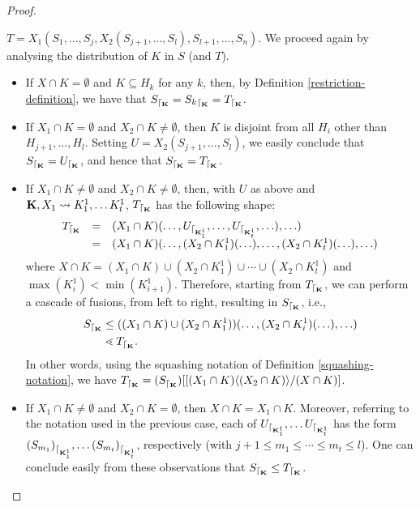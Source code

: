 \documentclass{article}
\theoremstyle{plain}
\theoremstyle{definition}
\newcommand{\inc}{\subseteq}
\newcommand{\hyper}[1]{{\bf #1}}
\newcommand{\restrconstr}[2]{{#1}_{\lceil_{#2}}}
\begin{document}
\begin{proof}
\begin{itemize}
$T=X_1(S_1,\ldots ,S_j,X_2(S_{j+1},\ldots ,S_l),S_{l+1},\ldots,S_n)$. We proceed again by analysing the distribution of $K$ in $S$ (and $T$).
\begin{itemize}
\item If $X\cap K=\emptyset$ and $K\inc H_k$ for any $k$, then, by Definition \ref{restriction-definition}, we have that $\restrconstr{S}{{\bf K}}=\restrconstr{S_k}{{\bf K}}=
\restrconstr{T}{{\bf K}}$.
\item If $X_1\cap K=\emptyset$ and $X_2\cap K\neq\emptyset$, then $K$ is disjoint from all $H_i$ other than $H_{j+1},\ldots,H_l$. Setting $U=X_2(S_{j+1},\ldots, S_l)$, we easily conclude that $\restrconstr{S}{{\bf K}}=\restrconstr{U}{{\bf K}}$, and hence that $\restrconstr{S}{{\bf K}}= \restrconstr{T}{{\bf K}}$.
\item If $X_1\cap K\neq \emptyset$ and $X_2 \cap K\neq \emptyset$, then, with $U$ as above and $\hyper{K},X_1\leadsto K^1_1,\ldots K^1_t$,
$\restrconstr{T}{{\bf K}}$ has the following shape:
$$\begin{array}{lll}
\restrconstr{T}{{\bf K}}& = & (X_1\cap K)(\ldots,\restrconstr{U}{{\bf K}^1_1},\ldots,\restrconstr{U}{{\bf K}^1_t},\ldots),\ldots)\\
& =& (X_1\cap K)(\ldots,(X_2\cap K^1_1)(\ldots),\ldots, (X_2\cap K^1_t)(\ldots),\ldots)
\end{array}$$
where $X\cap K= (X_1\cap K)\cup (X_2\cap K^1_1)\cup\cdots\cup(X_2\cap K^1_t)$ and $\max(K^1_i) < \min(K^1_{i+1})$.
Therefore, starting from $\restrconstr{T}{{\bf K}}$, we can perform a cascade of fusions, from left to right, resulting in $\restrconstr{S}{{\bf K}}$, i.e.,
\begin{align}
\restrconstr{S}{{\bf K}} & \leq ((X_1\cap K)\cup(X_2\cap K^1_1))(\ldots,(X_2\cap K^1_{i})(\ldots),\ldots) \\
& \lessdot \restrconstr{T}{{\bf K}}.
\end{align}
In other words, using the squashing notation of Definition \ref{squashing-notation}, we have $ \restrconstr{T}{{\bf K}}= (\restrconstr{S}{{\bf K}})[[(X_1\cap K)\langle (X_2\cap K)\rangle/(X\cap K)]$.
\item If $X_1\cap K\neq \emptyset$ and $X_2 \cap K=\emptyset$, then $X\cap K=X_1\cap K$. Moreover, referring to the notation used in the previous case, each of $\restrconstr{U}{{\bf K}^1_1},\ldots \restrconstr{U}{{\bf K}^1_t}$ has the form $\restrconstr{(S_{m_1})}{{\bf K}^1_1},\ldots \restrconstr{(S_{m_t})}{{\bf K}^1_t}$, respectively (with $j+1\leq m_1\leq\cdots\leq m_t\leq l$). One can conclude easily from these observations that $\restrconstr{S}{{\bf K}}\leq\restrconstr{T}{{\bf K}}$.

\end{itemize}
\end{itemize}
\end{proof}
\end{document}
